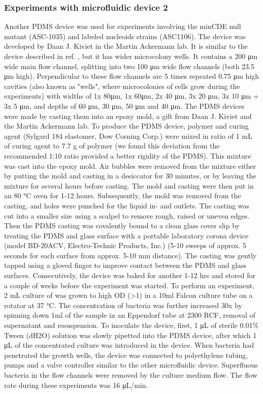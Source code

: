 \subsubsection{Experiments with microfluidic device 2}
Another PDMS device was used for experiments involving the minCDE null mutant (ASC-1035) and labeled nucleoids strains (ASC1106). The device was developed by Daan J. Kiviet in the Martin Ackermann lab. It is similar to the device described in ref. \cite{Taheri-Araghi2014}, but it has wider microcolony wells. It contains a 200 μm wide main flow channel, splitting into two 100 μm wide flow channels (both 23.5 μm high). Perpendicular to these flow channels are 5 times repeated 0.75 μm high cavities (also known as "wells", where microcolonies of cells grow during the experiments) with widths of 1x 80μm, 1x 60μm, 2x 40 μm, 3x 20 μm, 3x 10 μm + 3x 5 μm, and depths of 60 μm, 30 μm, 50 μm and 40 μm. The PDMS devices were made by casting them into an epoxy mold, a gift from Daan J. Kiviet and the Martin Ackermann lab.
To produce the PDMS device, polymer and curing agent (Sylgard 184 elastomer, Dow Corning Corp.) were mixed in ratio of 1 mL of curing agent to 7.7 g of polymer (we found this deviation from the recommended 1:10 ratio provided a better rigidity of the PDMS). This mixture was cast into the epoxy mold. Air bubbles were removed from the mixture either by putting the mold and casting in a desiccator for 30 minutes, or by leaving the mixture for several hours before casting. The mold and casting were then put in an 80 °C oven for 1-12 hours. Subsequently, the mold was removed from the casting, and holes were punched for the liquid in- and outlets. The casting was cut into a smaller size using a scalpel to remove rough, raised or uneven edges. Then the PDMS casting was covalently bound to a clean glass cover slip by treating the PDMS and glass surface with a portable laboratory corona device (model BD-20ACV, Electro-Technic Products, Inc.) (5-10 sweeps of approx. 5 seconds for each surface from approx. 5-10 mm distance). The casting was gently tapped using a gloved finger to improve contact between the PDMS and glass surfaces. Consecutively, the device was baked for another 1-12 hrs and stored  for a couple of weeks before the experiment was started. 
To perform an experiment, 2 mL culture of \ecoli was grown to high OD (>1) in a 10ml Falcon culture tube on a rotator at 37 °C. The concentration of bacteria was further increased 30x by spinning down 1ml of the sample in an Eppendorf tube at 2300 RCF, removal of supernatant and resuspension. To inoculate the device, first, 1 μL of sterile 0.01\% Tween (dH2O) solution was slowly pipetted into the PDMS device, after which 1 μL of the concentrated culture was introduced in the device. When bacteria had penetrated the growth wells, the device was connected to polyethylene tubing, pumps and a valve controller similar to the other microfluidic device. Superfluous bacteria in the flow channels were removed by the culture medium flow. The flow rate during these experiments was 16 μL/min.

